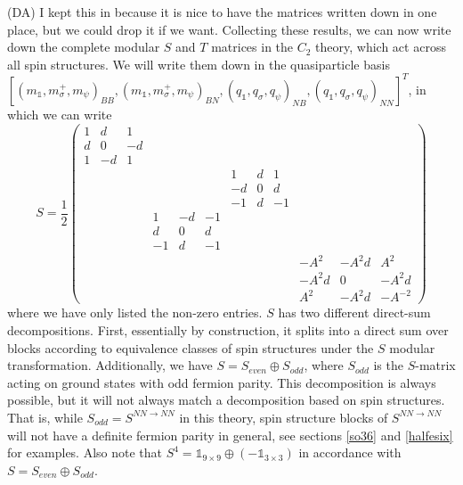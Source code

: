 \documentclass[12pt,a4paper]{article}
\newcounter{arrow}
\newcommand{\ra}{\rightarrow}
\newcommand{\unit}{\mathds{1}}
\newcommand\be            {\begin{equation}}
\newcommand\ee            {\end{equation}}
\newcommand{\dave}[1]{{\color{ao(english)}\footnotesize{(DA) #1}}}
\begin{document}
\medskip

\dave{I kept this in because it is nice to have the matrices written down in one place, but we could drop it if we want.}
Collecting these results, we can now write down the complete modular $S$ and $T$ matrices in the $C_2$ theory, 
which act across all spin structures. 
We will write them down in the quasiparticle 
basis $[(m_\unit,m_\sigma^+,m_\psi)_{BB},(m_\unit,m_\sigma^+,m_\psi)_{BN},(q_\unit,q_\sigma,q_\psi)_{NB},(q_\unit,q_\sigma,q_\psi)_{NN}]^T$, 
in which we can write
\be \label{modularS}
S = \frac{1}{2}\begin{pmatrix} 1 & d & 1 &			&&&			&&&			&& \\ 
					      d & 0 &-d &			&&&			&&&			&&\\
					      1&-d&1 & 			&&&			&&&			&&\\
						&&&				&&&			1&d&1&		&& \\
						&&&				&&&			-d&0&d&		&&\\
						&&&				&&&			-1&d&-1&		&&\\
						&&&				1&-d&-1&		&&&			&&\\
						&&&				d&0&d&		&&&			&&\\
						&&&				-1&d&-1&		&&&			&&\\
						&&&				&&&			&&&			-A^{2} & -A^{2}d & A^{2}\\
						&&&				&&&			&&&			-A^{2}d & 0 & -A^{2}d \\ 
						&&&				&&&			&&&			A^{2} & -A^{2}d & -A^{-2} \end{pmatrix}\ee		
where we have only listed the non-zero entries. 
$S$ has two different direct-sum decompositions. First, essentially by construction, 
it splits into a direct sum over blocks according to equivalence classes of spin structures 
under the $S$ modular transformation. 
Additionally, we have $S = S_{even} \oplus S_{odd}$, where $S_{odd}$ is the $S$-matrix 
acting on ground states with odd fermion parity.
This decomposition is always possible, but it will not always match a decomposition based 
on spin structures. 
That is, while $S_{odd} = S^{NN\ra NN}$ in this theory, spin structure blocks of $S^{NN\ra NN}$ 
will not have a definite fermion parity in general, see sections \ref{so36} and \ref{halfesix} for examples. 
Also note that $S^4 = \unit_{9\times9}\oplus(-\unit_{3\times3})$ in accordance with $S = S_{even} \oplus S_{odd}$. 
\end{document}
